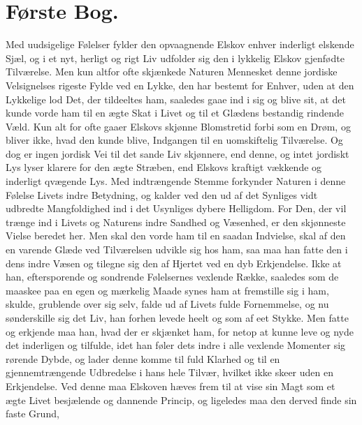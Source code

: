 \documentclass[12pt,a4paper]{book}
\newcommand{\apage}[1]{\marginnote{\footnotesize\textit{[#1]}}}
\begin{document}
\chapter*{Første Bog.}
 \apage{1}

Med uudsigelige Følelser fylder den opvaagnende Elskov enhver inderligt
elskende Sjæl, og i et nyt, herligt og rigt Liv udfolder sig den i
lykkelig Elskov gjenfødte Tilværelse. Men kun altfor ofte skjænkede
Naturen Mennesket denne jordiske Velsignelses rigeste Fylde ved en
Lykke, den har bestemt for Enhver, uden at den Lykkelige lod Det, der
tildeeltes ham, saaledes gaae ind i sig og blive sit, at det kunde
vorde ham til en ægte Skat i Livet og til et Glædens bestandig rindende
Væld. Kun alt for ofte gaaer Elskovs skjønne Blomstretid forbi som en
Drøm, og bliver ikke, hvad den kunde blive, Indgangen til en
uomskiftelig Tilværelse. Og dog er ingen jordisk Vei til det sande Liv
skjønnere, end denne, og intet jordiskt Lys lyser klarere for den ægte
Stræben, end Elskovs kraftigt vækkende og inderligt qvægende Lys. Med
indtrængende Stemme forkynder Naturen i denne Følelse Livets indre
Betydning, og kalder ved den ud af det Synliges vidt \apage{2} udbredte
Mangfoldighed ind i det Usynliges dybere Helligdom. For Den, der vil
trænge ind i Livets og Naturens indre Sandhed og Væsenhed, er den
skjønneste Vielse beredet her. Men skal den vorde ham til en saadan
Indvielse, skal af den en varende Glæde ved Tilværelsen udvikle sig hos
ham, saa maa han fatte den i dens indre Væsen og tilegne sig den af
Hjertet ved en dyb Erkjendelse. Ikke at han, eftersporende og sondrende
Følelsernes vexlende Række, saaledes som de maaskee paa en egen og
mærkelig Maade synes ham at fremstille sig i ham, skulde, grublende
over sig selv, falde ud af Livets fulde Fornemmelse, og nu
sønderskille sig det Liv, han forhen levede heelt og som af eet Stykke.
Men fatte og erkjende maa han, hvad der er skjænket ham, for netop at
kunne leve og nyde det inderligen og tilfulde, idet han føler dets
indre i alle vexlende Momenter sig rørende Dybde, og lader denne komme
til fuld Klarhed og til en gjennemtrængende Udbredelse i hans hele
Tilvær, hvilket ikke skeer uden en Erkjendelse. Ved denne maa Elskoven
hæves frem til at vise sin Magt som et ægte Livet besjælende og
dannende Princip, og ligeledes maa den derved finde sin faste Grund,
\end{document}
